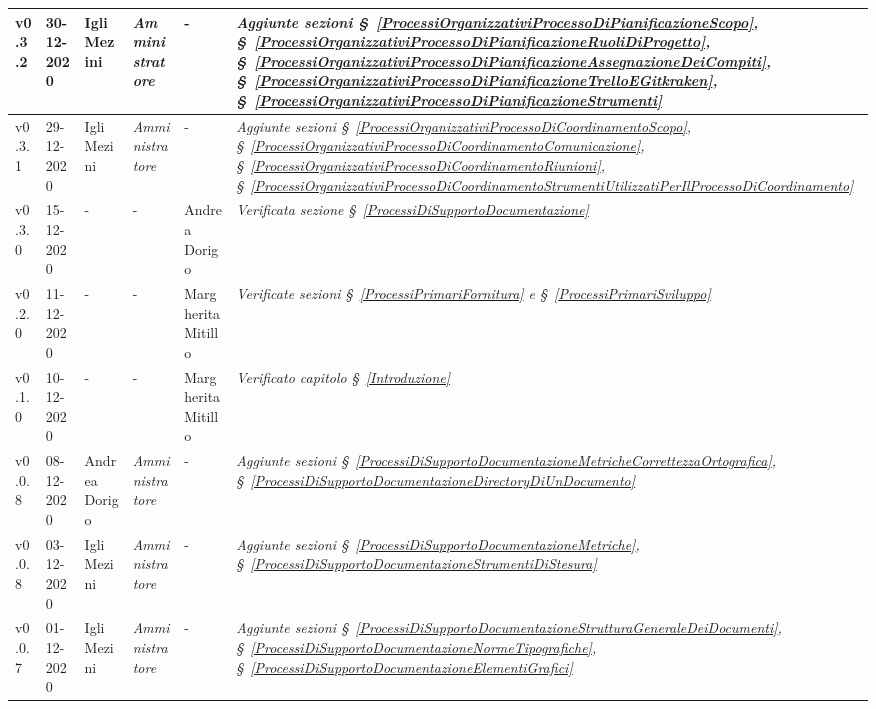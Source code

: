 {\begin{center}
\begin{longtable}[c]{|p{2cm-1\tabcolsep}|p{2cm}|p{3cm-2\tabcolsep}|p{3cm-1.5\tabcolsep}|p{}|p{4cm-2\tabcolsep}|}
		\hline
		\centering v0.3.2 & 30-12-2020 & Igli Mezini & \centering \textit{Amministratore} & \centering - & \textit{Aggiunte sezioni \S~\ref{ProcessiOrganizzativiProcessoDiPianificazioneScopo}, \S~\ref{ProcessiOrganizzativiProcessoDiPianificazioneRuoliDiProgetto}, \S~\ref{ProcessiOrganizzativiProcessoDiPianificazioneAssegnazioneDeiCompiti}, \S~\ref{ProcessiOrganizzativiProcessoDiPianificazioneTrelloEGitkraken}, \S~\ref{ProcessiOrganizzativiProcessoDiPianificazioneStrumenti} } \\
		\hline
		\centering v0.3.1 & 29-12-2020 & Igli Mezini & \centering \textit{Amministratore} & \centering - & \textit{Aggiunte sezioni \S~\ref{ProcessiOrganizzativiProcessoDiCoordinamentoScopo}, \S~\ref{ProcessiOrganizzativiProcessoDiCoordinamentoComunicazione}, \S~\ref{ProcessiOrganizzativiProcessoDiCoordinamentoRiunioni}, \S~\ref{ProcessiOrganizzativiProcessoDiCoordinamentoStrumentiUtilizzatiPerIlProcessoDiCoordinamento} } \\
		\hline
		\centering v0.3.0 & 15-12-2020 & \centering - & \centering - & Andrea Dorigo & 
		\textit{Verificata sezione \S~\ref{ProcessiDiSupportoDocumentazione}} \\
		\hline
		\centering v0.2.0 & 11-12-2020 & \centering - & \centering - & Margherita Mitillo & \textit{Verificate sezioni \S~\ref{ProcessiPrimariFornitura} e \S~\ref{ProcessiPrimariSviluppo} } \\
		\hline
		\centering v0.1.0 & 10-12-2020 & \centering - & \centering - & Margherita Mitillo & \textit{Verificato capitolo \S~\ref{Introduzione}} \\
		\hline
		\centering v0.0.8 & 08-12-2020 & Andrea Dorigo & \centering \textit{Amministratore} & \centering - & \textit{Aggiunte sezioni \S~\ref{ProcessiDiSupportoDocumentazioneMetricheCorrettezzaOrtografica}, \S~\ref{ProcessiDiSupportoDocumentazioneDirectoryDiUnDocumento}} \\
		\hline
		\centering v0.0.8 & 03-12-2020 & Igli Mezini & \centering \textit{Amministratore} & \centering - & \textit{Aggiunte sezioni \S~\ref{ProcessiDiSupportoDocumentazioneMetriche}, \S~\ref{ProcessiDiSupportoDocumentazioneStrumentiDiStesura}} \\
		\hline
		\centering v0.0.7 & 01-12-2020 & Igli Mezini & \centering \textit{Amministratore} & \centering - & \textit{Aggiunte sezioni \S~\ref{ProcessiDiSupportoDocumentazioneStrutturaGeneraleDeiDocumenti}, \S~\ref{ProcessiDiSupportoDocumentazioneNormeTipografiche}, \S~\ref{ProcessiDiSupportoDocumentazioneElementiGrafici}} \\

\end{longtable}
\end{center}}
